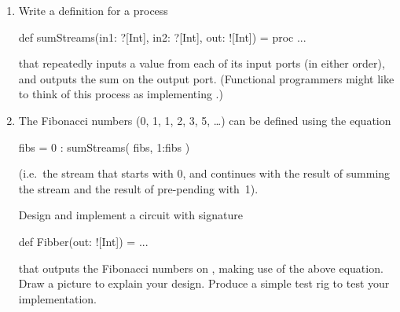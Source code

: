 \begin{question}
\begin{enumerate}
\item
Write a definition for a process
\begin{scala}
  def sumStreams(in1: ?[Int], in2: ?[Int], out: ![Int]) = proc{ ... }
\end{scala}
that repeatedly inputs a value from each of its input ports (in either order),
and outputs the sum on the output port.  (Functional programmers might like to
think of this process as implementing .)

\item
The Fibonacci numbers  (0, 1, 1, 2, 3, 5, \ldots) can be defined
using the equation
\begin{scala}
  fibs = 0 : sumStreams( fibs, 1:fibs )
\end{scala}
(i.e.\ the stream that starts with 0, and continues with the result of summing
the stream  and the result of pre-pending  with~1). 

Design and implement a circuit with signature
\begin{scala}
  def Fibber(out: ![Int]) = ...
\end{scala}
that outputs the Fibonacci numbers on , making use of the above
equation.  Draw a picture to explain your design.  Produce a simple test rig
to test your implementation.
\end{enumerate}
\end{question}


